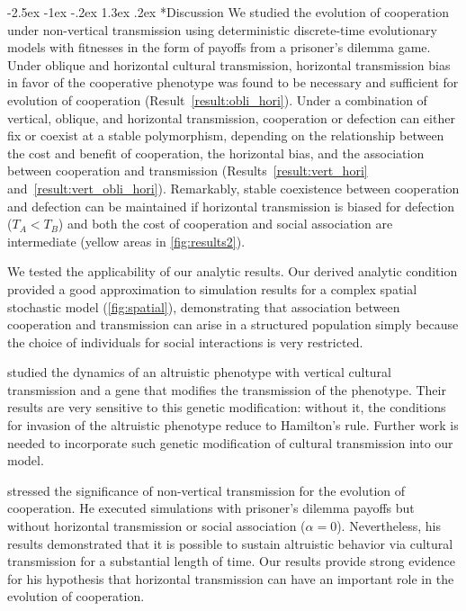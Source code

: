 \documentclass[12pt]{extarticle}
\makeatletter
\renewcommand\section{\@startsection {section}{1}{\z@}%
     {-2.5ex \@plus -1ex \@minus -.2ex}%
     {1.3ex \@plus.2ex}%
    {\Large\bfseries}}
\makeatother
\begin{document}
{%
\section*{Discussion}
We studied the evolution of cooperation under non-vertical transmission using deterministic discrete-time evolutionary models with fitnesses in the form of payoffs from a prisoner's dilemma game. 
Under oblique and horizontal cultural transmission, horizontal transmission bias in favor of the cooperative phenotype was found to be necessary and sufficient for evolution of cooperation (Result~\autoref{result:obli_hori}).
Under a combination of vertical, oblique, and horizontal transmission, cooperation or defection can either fix or coexist at a stable polymorphism, depending on the relationship between the cost and benefit of cooperation, the horizontal bias, and the association between cooperation and transmission (Results~\autoref{result:vert_hori} and~\autoref{result:vert_obli_hori}).
Remarkably, stable coexistence between cooperation and defection can be maintained if horizontal transmission is biased for defection ($T_A<T_B$) and both the cost of cooperation and social association are intermediate (yellow areas in \autoref{fig:results2}).

We tested the applicability of our analytic results. Our derived analytic condition provided a good approximation to simulation results for a complex spatial stochastic model  (\autoref{fig:spatial}), demonstrating that association between cooperation and transmission can arise in a structured population simply because the choice of individuals for social interactions is very restricted.

\citet{feldman1985gene} studied the dynamics of an altruistic phenotype with vertical cultural transmission and a gene that modifies the transmission of the phenotype. Their results are very sensitive to this genetic modification: without it, the conditions for invasion of the altruistic phenotype reduce to Hamilton's rule.
Further work is needed to incorporate such genetic modification of cultural transmission into our model.

\citet{woodcock2006significance} stressed the significance of non-vertical transmission for the evolution of cooperation. He executed simulations with prisoner's dilemma payoffs but without horizontal transmission or social association ($\alpha=0$). Nevertheless, his results demonstrated that it is possible to sustain altruistic behavior via cultural transmission for a substantial length of time.
Our results provide strong evidence for his hypothesis that horizontal transmission can have an important role in the evolution of cooperation. 

}
\end{document}
